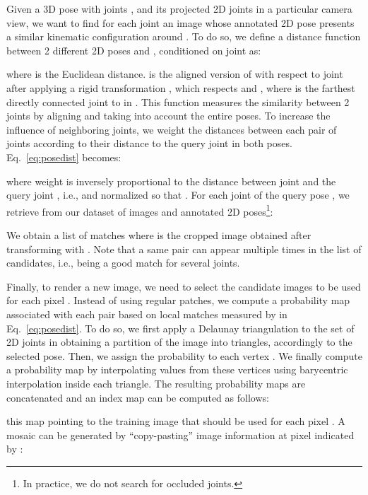 \documentclass{article}
\begin{document}
Given a 3D pose with  joints  , and its projected 2D joints   in  a particular camera view, we want to find for each joint  an image whose annotated 2D pose presents a similar kinematic configuration around . To do so, we define a distance function between 2 different 2D poses  and , conditioned on joint  as:

where  is the Euclidean distance.  is the
aligned version of  with respect to joint  after applying
a rigid transformation ,
which respects  and  , where  is the
farthest directly connected joint to  in . This function  measures the similarity between 2 joints by aligning and taking into account the entire poses. 
To increase the influence of neighboring joints, we weight the distances  between each pair of joints   according to their distance to the query joint  in both poses. Eq.~\ref{eq:posedist} becomes:
 
where weight  is inversely proportional to the distance between joint  and the query joint , i.e.,  and normalized so that . For each joint  of the query pose  ,
we retrieve from our dataset   of images and annotated 2D poses\footnote{In practice, we do not search for occluded joints.}:
 
We obtain a list of  matches  where
 is the cropped image obtained after transforming  with
. Note that a same pair
 can appear multiple times in the list of candidates,
i.e., being a good match for several joints. 








Finally, to render a new image, we need to select the candidate images  to be used for each pixel . Instead of using regular patches, we compute a probability map  associated with each pair  based on local matches measured by  in Eq.~\ref{eq:posedist}. To do so, we first apply a Delaunay triangulation to the set of 2D joints in   obtaining a partition of the image into triangles, accordingly to the selected pose. Then, we assign the probability  to each vertex . We finally compute a probability map  by interpolating values from these vertices using barycentric interpolation inside each triangle.
The resulting  probability maps are concatenated and  an index map  can be computed as follows: 

this map pointing to the training image  that should be used for each pixel . A mosaic  can be generated by ``copy-pasting'' image information at pixel  indicated by :

 
\end{document}
